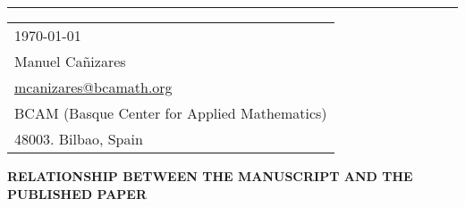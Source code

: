 \documentclass{article}
\begin{document}


\vspace{-1em} %

\rule{\linewidth}{1pt} %



\hfill
\begin{tabular}{l @{}}
	\hfill \today \bigskip                                              \\ %
	\hfill Manuel Ca\~{n}izares                                         \\
	\hfill \href{mailto:mcanizares@bcamath.org}{mcanizares@bcamath.org} \\
	\hfill BCAM (Basque Center for Applied Mathematics)                 \\
	\hfill 48003. Bilbao, Spain                                         \\ %
\end{tabular}

\bigskip %



\textbf{RELATIONSHIP BETWEEN THE MANUSCRIPT AND THE PUBLISHED PAPER}
\end{document}
